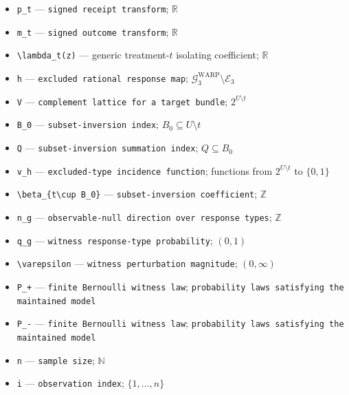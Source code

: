 \documentclass{article}
\begin{document}
\begin{itemize}
  \par\smallskip\noindent\emph{Definition.} \(r_{zt}=\mathbb E_P[Y\mathbf 1\{D=t\}\mid Z=z]\)
  \item \texttt{p\_\allowbreak{}t} --- \texttt{signed receipt transform}; \(\mathbb R\)
  \item \texttt{m\_\allowbreak{}t} --- \texttt{signed outcome transform}; \(\mathbb R\)
  \item \texttt{\textbackslash{}\allowbreak{}lambda\_\allowbreak{}t(z)} --- generic treatment-\(t\) isolating coefficient; \(\mathbb R\)
  \item \texttt{h} --- \texttt{excluded rational response map}; \(\mathcal G^{\mathrm{WARP}}_3\setminus\mathcal E_3\)
  \item \texttt{V} --- \texttt{complement lattice for a target bundle}; \(2^{U\setminus t}\)
  \item \texttt{B\_\allowbreak{}0} --- \texttt{subset-\allowbreak{}inversion index}; \(B_0\subseteq U\setminus t\)
  \item \texttt{Q} --- \texttt{subset-\allowbreak{}inversion summation index}; \(Q\subseteq B_0\)
  \item \texttt{v\_\allowbreak{}h} --- \texttt{excluded-\allowbreak{}type incidence function}; functions from \(2^{U\setminus t}\) to \(\{0,1\}\)
  \item \texttt{\textbackslash{}\allowbreak{}beta\_\allowbreak{}\{t\textbackslash{}\allowbreak{}cup B\_\allowbreak{}0\}\allowbreak{}} --- \texttt{subset-\allowbreak{}inversion coefficient}; \(\mathbb Z\)
  \item \texttt{n\_\allowbreak{}g} --- \texttt{observable-\allowbreak{}null direction over response types}; \(\mathbb Z\)
  \item \texttt{q\_\allowbreak{}g} --- \texttt{witness response-\allowbreak{}type probability}; \((0,1)\)
  \item \texttt{\textbackslash{}\allowbreak{}varepsilon} --- \texttt{witness perturbation magnitude}; \((0,\infty)\)
  \item \texttt{P\_\allowbreak{}+\allowbreak{}} --- \texttt{finite Bernoulli witness law}; \texttt{probability laws satisfying the maintained model}
  \item \texttt{P\_\allowbreak{}-\allowbreak{}} --- \texttt{finite Bernoulli witness law}; \texttt{probability laws satisfying the maintained model}
  \item \texttt{n} --- \texttt{sample size}; \(\mathbb N\)
  \item \texttt{i} --- \texttt{observation index}; \(\{1,\ldots,n\}\)

\end{itemize}
\end{document}
